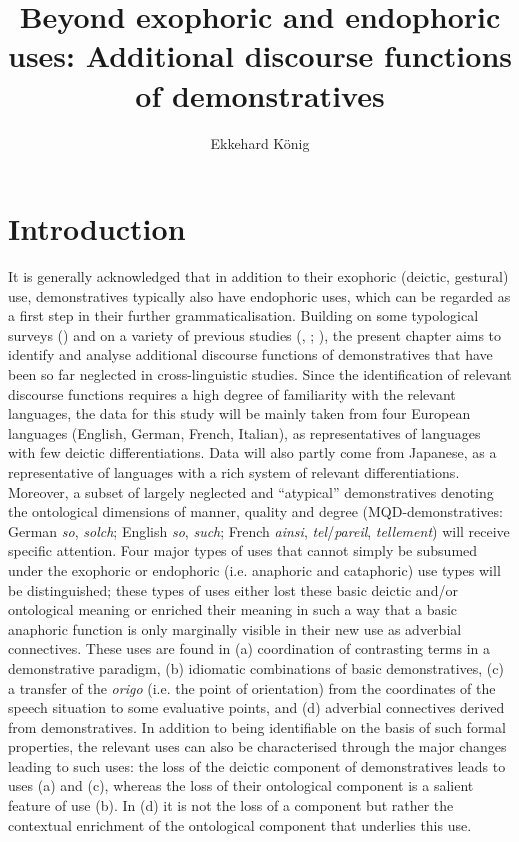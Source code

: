 \documentclass[output=paper,colorlinks,citecolor=brown]{langscibook}
\author{Ekkehard König\affiliation{Free University of Berlin}\orcid{}}
\title{Beyond exophoric and endophoric uses: Additional discourse functions of demonstratives}
\begin{document}
\maketitle
{}

\section{Introduction}

It is generally acknowledged that in addition to their exophoric (deictic, gestural) use, demonstratives typically also have endophoric uses, which can be regarded as a first step in their further grammaticalisation. Building on some typological surveys (\citealt{Diessel1999Book,Dixon2003}) and on a variety of previous studies (\citealt{König2015}, \citeyear{König2017}; \citealt{KönigNishina2015}), the present chapter aims to identify and analyse additional discourse functions of demonstratives that have been so far neglected in cross-linguistic studies. Since the identification of relevant discourse functions requires a high degree of familiarity with the relevant languages, the data for this study will be mainly taken from four European languages (English, German, French, Italian), as representatives of languages with few deictic differentiations. Data will also partly come from Japanese, as a representative of languages with a rich system of relevant differentiations. Moreover, a subset of largely neglected and “atypical” demonstratives denoting the ontological dimensions of manner, quality and degree (MQD-demonstratives: German \textit{so}, \textit{solch}; English \textit{so}, \textit{such}; French \textit{ainsi}, \textit{tel}/\textit{pareil}, \textit{tellement}) will receive specific attention. Four major types of uses that cannot simply be subsumed under the exophoric or endophoric (i.e. anaphoric and cataphoric) use types will be distinguished; these types of uses either lost these basic deictic and/or ontological meaning or enriched their meaning in such a way that a basic anaphoric function is only marginally visible in their new use as adverbial connectives. These uses are found in (a) coordination of contrasting terms in a demonstrative paradigm, (b) idiomatic combinations of basic demonstratives, (c) a transfer of the \textit{origo} (i.e. the point of orientation) from the coordinates of the speech situation to some evaluative points, and (d) adverbial connectives derived from demonstratives. In addition to being identifiable on the basis of such formal properties, the relevant uses can also be characterised through the major changes leading to such uses: the loss of the deictic component of demonstratives leads to uses (a) and (c), whereas the loss of their ontological component is a salient feature of use (b). In (d) it is not the loss of a component but rather the contextual enrichment of the ontological component that underlies this use.
\end{document}
